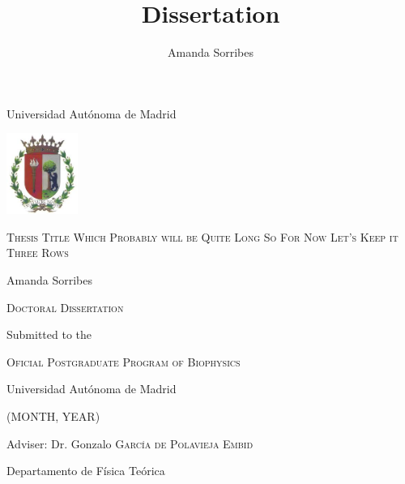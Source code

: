 \cleardoublepage
{}
\begin{titlepage}

\begin{center}

{\large Universidad Autónoma de Madrid}
\vspace{0.3cm}

\includegraphics[width=0.175\textwidth]{Frontmatter/Escudo_UAM}
\vspace{2.2cm}

\fontsize{30}{24}\selectfont
\textsc{ \huge Thesis Title Which Probably will be Quite Long So For Now Let's Keep it Three Rows}
\vspace{2.0cm}

\fontsize{11}{13}\selectfont
{\LARGE  Amanda Sorribes}
\vspace{3.6cm}

{\large \textsc{Doctoral Dissertation}}%
\vspace{0.16cm}

{\large Submitted to the}
\vspace{0.16cm}

\textsc{\large Oficial Postgraduate Program of Biophysics}%
\vspace{0.16cm}

{\large Universidad Autónoma de Madrid}
\vspace{0.16cm}

{\normalsize (MONTH, YEAR)}

\vfill

{\large Adviser: Dr. Gonzalo \textsc{García de Polavieja Embid}}
\vspace{0.15cm}

{\large Departamento de Física Teórica}

\vfill


\end{center}
\restoregeometry
\end{titlepage}

\thispagestyle{empty}

\title{Dissertation}
\author{Amanda Sorribes}

